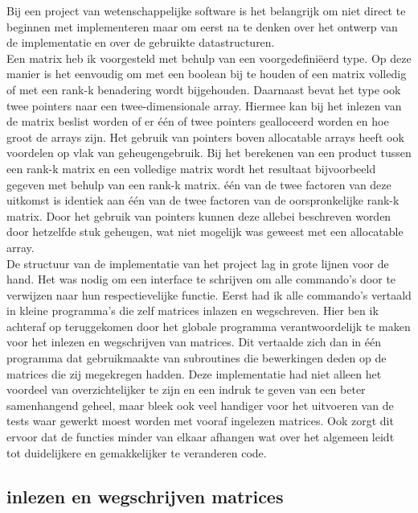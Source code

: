 \documentclass[a4paper]{article}
\begin{document}
Bij een project van wetenschappelijke software is het belangrijk om niet direct te beginnen met implementeren maar om eerst na te denken over het ontwerp van de implementatie en over de gebruikte datastructuren.\\ 
Een matrix heb ik voorgesteld met behulp van een voorgedefini\"eerd type. Op deze manier is het eenvoudig om met een boolean bij te houden of een matrix volledig of met een rank-k benadering wordt bijgehouden. Daarnaast bevat het type ook twee pointers naar een twee-dimensionale array. Hiermee kan bij het inlezen van de matrix beslist worden of er \'e\'en of twee pointers gealloceerd worden en hoe groot de arrays zijn. Het gebruik van pointers boven allocatable arrays heeft ook voordelen op vlak van geheugengebruik. Bij het berekenen van een product tussen een rank-k matrix en een volledige matrix wordt het resultaat bijvoorbeeld gegeven met behulp van een rank-k matrix. \'e\'en van de twee factoren van deze uitkomst is identiek aan \'e\'en van de twee factoren van de oorspronkelijke rank-k matrix. Door het gebruik van pointers kunnen deze allebei beschreven worden door hetzelfde stuk geheugen, wat niet mogelijk was geweest met een allocatable array. \\
De structuur van de implementatie van het project lag in grote lijnen voor de hand. Het was nodig om een interface te schrijven om alle commando's door te verwijzen naar hun respectievelijke functie. Eerst had ik alle commando's vertaald in kleine programma's die zelf matrices inlazen en wegschreven. Hier ben ik achteraf op teruggekomen door het globale programma verantwoordelijk te maken voor het inlezen en wegschrijven van matrices. Dit vertaalde zich dan in \'e\'en programma dat gebruikmaakte van subroutines die bewerkingen deden op de matrices die zij megekregen hadden. Deze implementatie had niet alleen het voordeel van overzichtelijker te zijn en een indruk te geven van een beter samenhangend geheel, maar bleek ook veel handiger voor het uitvoeren van de tests waar gewerkt moest worden met vooraf ingelezen matrices. Ook zorgt dit ervoor dat de functies minder van elkaar afhangen wat over het algemeen leidt tot duidelijkere en gemakkelijker te veranderen code.

\subsection*{inlezen en wegschrijven matrices}
\end{document}
